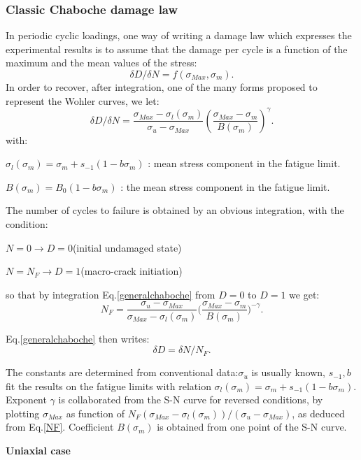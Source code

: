 \documentclass[3p,times,procedia,number]{elsarticle}
\begin{document}
\subsubsection{Classic Chaboche damage law}

In periodic cyclic loadings, one way of writing a damage law which expresses the experimental results is to assume that the damage per cycle is a function of the maximum and the mean values of the stress:
$$\delta D/\delta N=f(\sigma_{Max},\sigma_m).$$
In order to recover, after integration, one of the many forms proposed to represent the Wohler curves, we let:
\begin{equation}
\delta D/\delta N=\frac{\sigma_{Max}-\sigma_l(\sigma_m)}{\sigma_{u}-\sigma_{Max}}(\frac{\sigma_{Max}-\sigma_m}{B(\sigma_m)})^{\gamma}.
\label{generalchaboche}
\end{equation}
with:

$\sigma_l(\sigma_m)=\sigma_m+s_{-1}(1-b\sigma_m)$ : mean stress component in the fatigue limit.

$B(\sigma_m)=B_0(1-b\sigma_m)$ : the mean stress component in the fatigue limit.

The number of cycles to failure is obtained by an obvious integration, with the condition:

$N=0 \to D=0$(initial undamaged state)

$N=N_F \to D=1$(macro-crack initiation)

so that by integration Eq.\eqref{generalchaboche} from $D=0$ to $D=1$ we get:
\begin{equation}N_F=\frac{\sigma_{u}-\sigma_{Max}}{\sigma_{Max}-\sigma_l(\sigma_m)}\big(\frac{\sigma_{Max}-\sigma_m}{B(\sigma_m)}\big)^{-\gamma}.
\label{NF}
\end{equation}

Eq.\eqref{generalchaboche} then writes:
$$\delta D=\delta N/N_F.$$

The constants are determined from conventional data:$\sigma_u$ is usually known, $s_{-1},b$ fit the results on the fatigue limits with relation $\sigma_l(\sigma_m)=\sigma_m+s_{-1}(1-b\sigma_m)$. Exponent $\gamma$ is collaborated from the S-N curve for reversed conditions, by plotting $\sigma_{Max}$ as function of $N_F(\sigma_{Max}-\sigma_l(\sigma_m))/(\sigma_{u}-\sigma_{Max})$, as deduced from Eq.\eqref{NF}. Coefficient $B(\sigma_m)$ is obtained from one point of the S-N curve.

\vspace{6pt}
\textbf{Uniaxial case}
\vspace{6pt}
\end{document}
